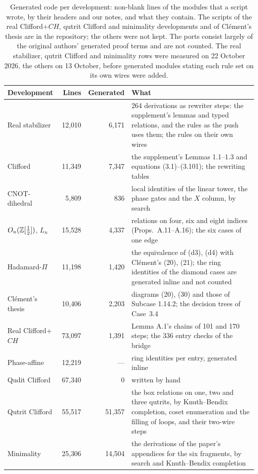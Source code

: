 \begin{table}[h]
\caption{Generated code per development: non-blank lines of the
modules that a script wrote, by their headers and our notes, and what
they contain. The scripts of the real Clifford+$CH$, qutrit Clifford
and minimality developments and of Cl\'ement's thesis are in the
repository; the others were not kept. The ports consist largely of the
original authors' generated proof terms and are not counted. The real
stabilizer, qutrit Clifford and minimality rows were measured on 22
October 2026, the others on 13 October, before generated modules
stating each rule set on its own wires were added.}
\label{tab:generated}
\small
\setlength{\tabcolsep}{4pt}
\begin{tabularx}{\linewidth}{@{}l r r Y@{}}
\toprule
Development & Lines & Generated & What \\
\midrule
Real stabilizer & 12{,}010 & 6{,}171 & 264 derivations as rewriter steps: the supplement's lemmas and typed relations, and the rules as the push uses them; the rules on their own wires \\
Clifford & 11{,}349 & 7{,}347 & the supplement's Lemmas 1.1--1.3 and equations (3.1)--(3.101); the rewriting tables \\
CNOT-dihedral & 5{,}809 & 836 & local identities of the linear tower, the phase gates and the $X$ column, by search \\
$O_n(\mathbb{Z}[\frac12])$, $L_n$ & 15{,}528 & 4{,}337 & relations on four, six and eight indices (Props.~A.11--A.16); the six cases of one edge \\
Hadamard-$\Pi$ & 11{,}198 & 1{,}420 & the equivalence of (d3), (d4) with Cl\'ement's (20), (21); the ring identities of the diamond cases are generated inline and not counted \\
Cl\'ement's thesis & 10{,}406 & 2{,}203 & diagrams (20), (30) and those of Subcase 1.14.2; the decision trees of Case~3.4 \\
Real Clifford+$CH$ & 73{,}097 & 1{,}391 & Lemma A.1's chains of 101 and 170 steps; the 336 entry checks of the bridge \\
Phase-affine & 12{,}219 & --- & ring identities per entry, generated inline \\
Qudit Clifford & 67{,}340 & 0 & written by hand \\
Qutrit Clifford & 55{,}517 & 51{,}357 & the box relations on one, two and three qutrits, by Knuth--Bendix completion, coset enumeration and the filling of loops, and their two-wire steps \\
Minimality & 25{,}306 & 14{,}504 & the derivations of the paper's appendices for the six fragments, by search and Knuth--Bendix completion \\
\bottomrule
\end{tabularx}
\end{table}
